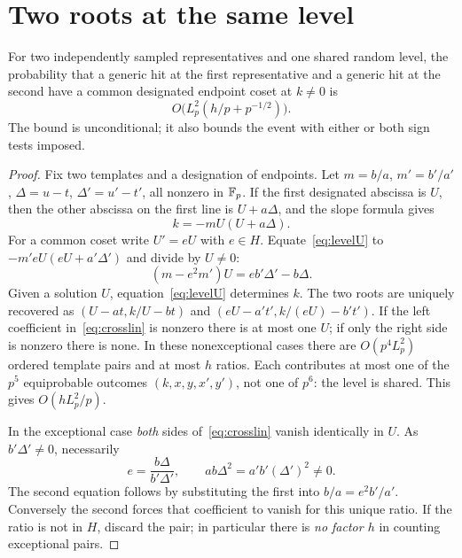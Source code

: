 \section{Two roots at the same level}\label{sec:two}
\begin{proposition}\label{prop:cross}
For two independently sampled representatives and one shared random level, the probability that a generic hit at the first representative and a generic hit at the second have a common designated endpoint coset at $k\ne0$ is
\[
 O\big(L_p^2(h/p+p^{-1/2})\big).
\]
The bound is unconditional; it also bounds the event with either or both sign tests imposed.
\end{proposition}
\begin{proof}
Fix two templates and a designation of endpoints. Let $m=b/a$, $m'=b'/a'$, $\Delta=u-t$, $\Delta'=u'-t'$, all nonzero in $\mathbb F_p$. If the first designated abscissa is $U$, then the other abscissa on the first line is $U+a\Delta$, and the slope formula gives
\begin{equation}\label{eq:levelU}
 k=-mU(U+a\Delta).
\end{equation}
For a common coset write $U'=eU$ with $e\in H$. Equate~\eqref{eq:levelU} to $-m'eU(eU+a'\Delta')$ and divide by $U\ne0$:
\begin{equation}\label{eq:crosslin}
 (m-e^2m')U=e b'\Delta'-b\Delta.
\end{equation}
Given a solution $U$, equation~\eqref{eq:levelU} determines $k$. The two roots are uniquely recovered as $(U-at,k/U-bt)$ and $(eU-a't',k/(eU)-b't')$. If the left coefficient in~\eqref{eq:crosslin} is nonzero there is at most one $U$; if only the right side is nonzero there is none. In these nonexceptional cases there are $O(p^4L_p^2)$ ordered template pairs and at most $h$ ratios. Each contributes at most one of the $p^5$ equiprobable outcomes $(k,x,y,x',y')$, not one of $p^6$: the level is shared. This gives $O(hL_p^2/p)$.

In the exceptional case \emph{both} sides of~\eqref{eq:crosslin} vanish identically in $U$. As $b'\Delta'\ne0$, necessarily
\begin{equation}\label{eq:exception}
 e=\frac{b\Delta}{b'\Delta'},\qquad ab\Delta^2=a'b'(\Delta')^2\ne0.
\end{equation}
The second equation follows by substituting the first into $b/a=e^2 b'/a'$. Conversely the second forces that coefficient to vanish for this unique ratio. If the ratio is not in $H$, discard the pair; in particular there is \emph{no factor $h$} in counting exceptional pairs.


\end{proof}
